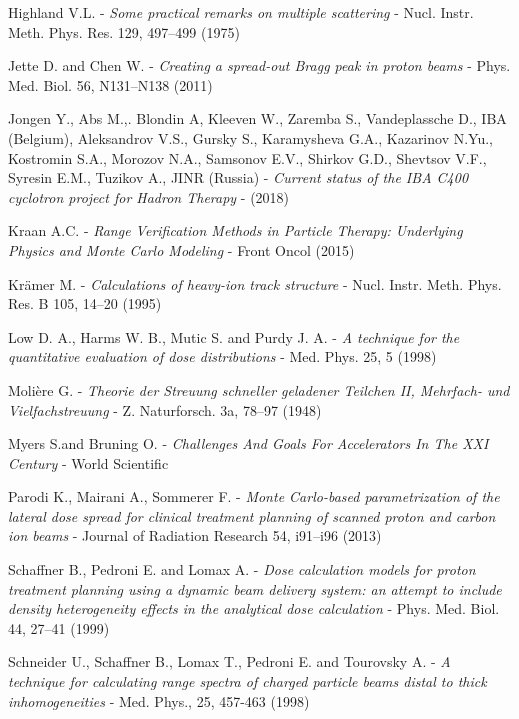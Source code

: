 \documentclass[12pt, a4paper, twoside]{book}
\begin{document}
\begin{thebibliography}{99}
Highland V.L. -
\emph{Some practical remarks on multiple scattering} -
Nucl. Instr. Meth. Phys. Res. 129, 497–499 (1975)

Jette D. and Chen W. - 
\emph{Creating a spread-out Bragg peak in proton beams} -
Phys. Med. Biol. 56, N131–N138 (2011)

Jongen Y., Abs M.,. Blondin A, Kleeven W., Zaremba S., Vandeplassche D., IBA (Belgium), Aleksandrov V.S., Gursky S., Karamysheva G.A., Kazarinov N.Yu., Kostromin S.A., Morozov N.A., Samsonov E.V., Shirkov G.D., Shevtsov V.F., Syresin E.M., Tuzikov A., JINR (Russia) - 
\emph{Current status of the IBA C400 cyclotron project for Hadron Therapy} - 
(2018)

Kraan A.C. -
\emph{Range Verification Methods in Particle Therapy: Underlying Physics and Monte Carlo Modeling} - 
Front Oncol (2015)

Krämer M. - 
\emph{Calculations of heavy-ion track structure} - 
Nucl. Instr. Meth. Phys. Res. B 105, 14–20 (1995)

Low D. A., Harms W. B., Mutic S. and Purdy J. A. -
\emph{A technique for the quantitative evaluation of dose distributions} -
Med. Phys. 25, 5 (1998)

Molière G. -
\emph{Theorie der Streuung schneller geladener Teilchen II, Mehrfach- und Vielfachstreuung} - 
Z. Naturforsch. 3a, 78–97 (1948)

Myers S.and  Bruning O. -
\emph{Challenges And Goals For Accelerators In The XXI Century} -
World Scientific

Parodi K., Mairani A., Sommerer F. -
\emph{Monte Carlo-based parametrization of the lateral dose spread for clinical treatment planning of scanned proton and carbon ion beams} -
Journal of Radiation Research 54, i91–i96 (2013)

Schaffner B., Pedroni E. and Lomax A. -
\emph{Dose calculation models for proton treatment planning using a dynamic beam delivery system: an attempt to include density heterogeneity effects in the analytical dose calculation} - 
Phys. Med. Biol. 44, 27–41 (1999)

Schneider U.,  Schaffner B., Lomax T., Pedroni E. and Tourovsky A. -
\emph{A technique for calculating range spectra of charged particle beams distal to thick inhomogeneities} -
Med. Phys., 25, 457-463 (1998)


\end{thebibliography}
\end{document}
